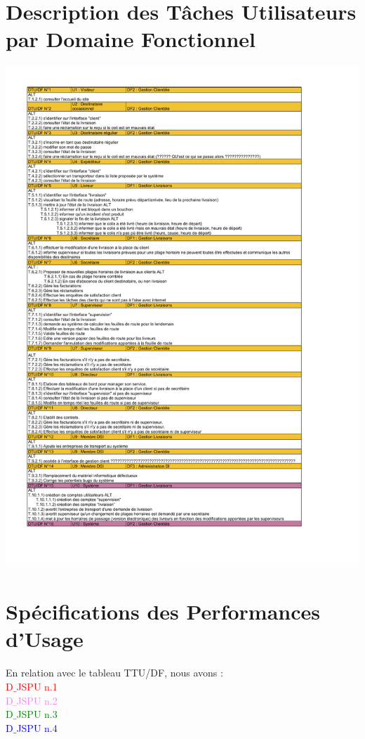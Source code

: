 \documentclass{report}
\begin{document}
\section{Description des Tâches Utilisateurs par Domaine Fonctionnel}

\includegraphics[scale = 0.8]{images/DTUDF.pdf}

\section{Spécifications des Performances d'Usage}

En relation avec le tableau TTU/DF, nous avons : \\
\textcolor{red}{D$\_$JSPU n.1}\\
\textcolor{violet}{D$\_$JSPU n.2}\\
\textcolor{green}{D$\_$JSPU n.3}\\
\textcolor{blue}{D$\_$JSPU n.4}
\end{document}

